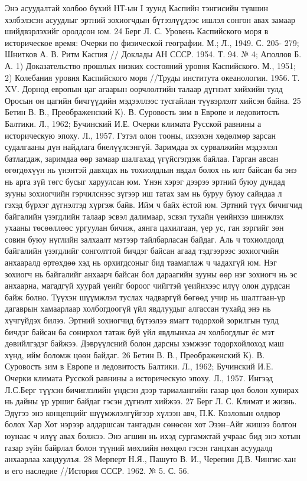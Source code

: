 Энэ асуудалтай холбоо бүхий НТ-ын I зуунд Каспийн тэнгисийн түвшин хэлбэлзсэн асуудлыг эртний зохиогчдын бүтээлүүдээс ишлэл сонгон авах замаар шийдвэрлэхийг оролдсон юм.
24 Берг Л. С. Уровень Каспийского моря в историческое время: Очерки по физической географии. М.; Л., 1949. С. 205- 279; Шнитков А. В. Ритм Каспия // Доклады АН СССР. 1954. Т. 94. № 4; Аполлов Б. А. 1) Доказательство прошлых низких состояний уровня Каспийского. М., 1951; 2) Колебания уровня Каспийского моря //Труды института океанологии. 1956. Т. XV.
Дорнод европын цаг агаарын өөрчлөлтийн талаар дүгнэлт хийхийн тулд Оросын он цагийн бичгүүдийн мэдээллээс тусгайлан түүвэрлэлт хийсэн байна.
25 Бетин В. В., Преображенский К). В. Суровость зим в Европе и ледовитость Балтики. Л., 1962; Бучинский И.Е. Очерки климата Русской равнины а историческую эпоху. Л., 1957.
Гэтэл олон тооны, ихээхэн хөдөлмөр зарсан судалгааны дүн найдлага биелүүлсэнгүй. Заримдаа эх сурвалжийн мэдээлэл батлагдаж, заримдаа өөр замаар шалгахад үгүйсгэгдэж байлаа. Гарган авсан өгөгдөхүүн нь үнэнтэй давхцах нь тохиолдлын явдал болох нь илт байсан ба энэ нь арга зүй төгс бусыг харуулсан юм. Үнэн хэрэг дээрээ эртний буюу дундад зууны зохиогчийн гэрчилснээс зүгээр иш татах зам нь буруу буюу сайндаа л гэхэд бүрхэг дүгнэлтэд хүргэж байв. Ийм ч байх ёстой юм.
Эртний түүх бичигчид байгалийн үзэгдлийн талаар эсвэл далимаар, эсвэл тухайн үеийнхээ шинжлэх ухааны төсөөллөөс ургуулан бичиж, аянга цахилгаан, үер ус, ган зэргийг зөн совин буюу нүглийн залхаалт мэтээр тайлбарласан байдаг. Аль ч тохиолдолд байгалийн үзэгдлийг сонголттой бичдэг байсан агаад тэдгээрээс зохиогчийн анхааралд өртөхдөө хэд нь орхигдсоныг бид таамаглаж ч чадахгүй юм. Нэг зохиогч нь байгалийг анхаарч байсан бол дараагийн зууны өөр нэг зохиогч нь эс анхаарна, магадгүй хуурай үеийг бороог чийгтэй үеийнхээс илүү олон дурдсан байж болно. Түүхэн шүүмжлэл туслах чадваргүй бөгөөд учир нь шалтгаан-үр дагаврын хамаарлаар холбогдоогүй үйл явдлуудыг алгассан тухайд энэ нь хүчгүйдэх билээ.
Эртний зохиогчид бүтээлээ ямагт тодорхой зорилгын тулд бичдэг байсан ба сонирхол татаж буй үйл явдлынхаа ач холбогдлыг ёс мэт дөвийлгэдэг байжээ. Дэврүүлсний болон дарсны хэмжээг тодорхойлоход маш хүнд, ийм боломж цөөн байдаг.
26 Бетин В. В., Преображенский К). В. Суровость зим в Европе и ледовитость Балтики. Л., 1962; Бучинский И.Е. Очерки климата Русской равнины а историческую эпоху. Л., 1957.
Ингээд Л.С.Берг түүхэн бичиглэлийн үндсэн дээр тариалангийн газар цөл болон хувирах нь дайны үр уршиг байдаг гэсэн дүгнэлт хийжээ. 27 Берг Л. С. Климат и жизнь.
Эдүгээ энэ концепцийг шүүмжлэлгүйгээр хүлээн авч, П.К. Козловын олдвор болох Хар Хот нэрээр алдаршсан тангадын сөнөсөн хот Эзэн–Айг жишээ болгон юунаас ч илүү авах болжээ. Энэ агшин нь ихэд сургамжтай учраас бид энэ хотын газар зүйн байрлал болон түүний мөхлийн нөхцөл гэсэн ганцхан асуудалд анхаарлаа хандуулъя. 28 Мерперт Н.Я., Пашуто В. И., Черепин Д.В. Чингис-хан и его наследие //История СССР. 1962. № 5. С. 56.
